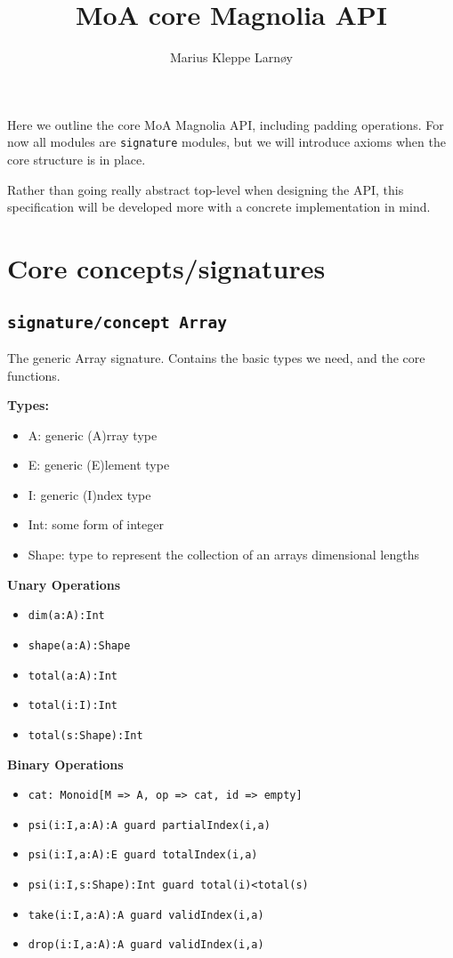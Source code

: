 \documentclass{article}
\author{Marius Kleppe Larnøy}
\begin{document}
\title{MoA core Magnolia API}
\maketitle

\noindent Here we outline the core MoA Magnolia API, including padding operations. For now all modules are \texttt{signature} modules, but we will introduce axioms when the core structure is in place.

\noindent Rather than going really abstract top-level when designing the API, this specification will be developed more with a concrete implementation in mind.

\section{Core concepts/signatures}

\subsection{\texttt{signature/concept Array}}
\noindent The generic Array signature. Contains the basic types we need, and the core functions.

\noindent \textbf{Types:}
\begin{itemize}
    \item A: generic (A)rray type
    \item E: generic (E)lement type
    \item I: generic (I)ndex type
    \item Int: some form of integer
    \item Shape: type to represent the collection of an arrays dimensional lengths
\end{itemize}

\noindent \textbf{Unary Operations}
\begin{itemize}
    \item \texttt{dim(a:A):Int}
    \item \texttt{shape(a:A):Shape}
    \item \texttt{total(a:A):Int}
    \item \texttt{total(i:I):Int}
    \item \texttt{total(s:Shape):Int}
\end{itemize}

\noindent \textbf{Binary Operations}
\begin{itemize}
    \item \texttt{cat: Monoid[M => A, op => cat, id => empty]}
    \item \texttt{psi(i:I,a:A):A guard partialIndex(i,a)}
    \item \texttt{psi(i:I,a:A):E guard totalIndex(i,a)}
    \item \texttt{psi(i:I,s:Shape):Int guard total(i)<total(s)}
    \item \texttt{take(i:I,a:A):A guard validIndex(i,a)}
    \item \texttt{drop(i:I,a:A):A guard validIndex(i,a)}
\end{itemize}
\end{document}
